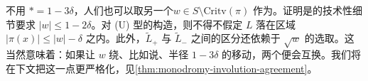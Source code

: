 不用 $*=1-3\delta$，人们也可以取另一个\trRegularValue{}$w\in S\setminus\mathrm{Critv}(\pi)$ 作为\trBranchPoint。证明\trDoubleBranchedCover{}是\trLefschetzFibration{}的技术性细节要求 $|w|\le 1-2\delta$。对 (U) 型\trLagrange\trSubmanifold{}的构造，则不得不假定 $L$ 落在区域 $|\pi(x)|\le|w|-\delta$ 之内。此外，$\widetilde{L}_+$ 与 $\widetilde{L}_-$ 之间的区分还依赖于 $\sqrt{w}$ 的选取。这当然意味着：如果让 $w$ 绕、比如说、半径 $1-3\delta$ 的\trCircle{}移动，两个\trConnectedComponent{}便会互换。我们将在下文把这一点更严格化，见\cref{thm:monodromy-involution-agreement}。
